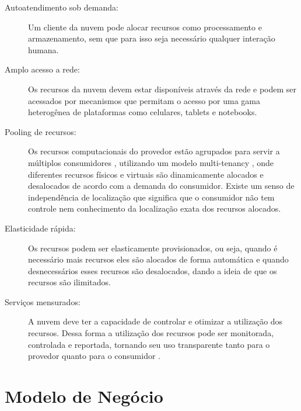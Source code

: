 \begin{description}

	\item[Autoatendimento sob demanda:] Um cliente da nuvem pode alocar recursos como processamento e armazenamento, sem que para isso seja necessário qualquer interação humana.
	
	\item[Amplo acesso a rede:] Os recursos da nuvem devem estar
            disponíveis através da rede  e podem ser acessados por mecanismos que permitam o acesso por uma gama heterogênea de plataformas como celulares, tablets e notebooks.
	
	\item[Pooling de recursos:] Os recursos computacionais do provedor
            estão agrupados para servir a múltiplos consumidores
            ,
            utilizando um modelo multi-tenancy , onde diferentes recursos físicos e virtuais são dinamicamente alocados e desalocados de acordo com a demanda do consumidor. Existe um senso de independência de localização que significa que o consumidor não tem controle nem conhecimento da localização exata dos recursos alocados.
	
	\item[Elasticidade rápida:] Os recursos podem ser elasticamente provisionados, ou seja, quando é necessário mais recursos eles são alocados de forma automática e quando desnecessários esses recursos são desalocados, dando a ideia de que os recursos são ilimitados.
	
	\item[Serviços mensurados:] A nuvem deve ter a capacidade de controlar
            e otimizar a utilização dos recursos. Dessa forma a utilização dos
            recursos pode ser monitorada, controlada e reportada, tornando seu
            uso transparente  tanto para o provedor quanto para o consumidor .

\end{description} 



\section{Modelo de Negócio} \label{cloud:bus}

